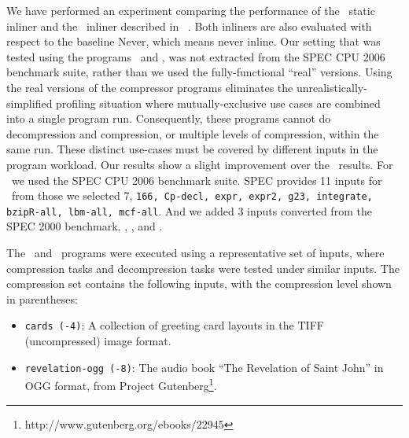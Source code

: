 
We have performed an experiment comparing the performance of the \llvm\ static inliner and the \FDI\ inliner described in ~\cite{BerubePhD}. Both inliners are also evaluated with respect to the baseline Never, which means never inline. Our setting that was tested using the programs \bzip\ and \gzip, was not extracted from the SPEC CPU 2006 benchmark suite, rather than we used the fully-functional ``real'' versions. Using the real versions of the compressor programs eliminates the unrealistically-simplified profiling situation where mutually-exclusive use cases are combined into a single program run. Consequently, these programs cannot do decompression and compression, or multiple levels of compression, within the same run.  These distinct use-cases must be covered by different inputs in the program workload. Our results show a slight improvement over the \llvm\ results. For \gcc\ we used the SPEC CPU 2006 benchmark suite.  SPEC provides 11 inputs for \gcc\ from those we selected 7, {\tt 166, Cp-decl, expr, expr2, g23, integrate, bzipR-all, lbm-all, mcf-all}. And we added 3 inputs converted from the SPEC 2000 benchmark, \bzip, \lbm, and \mcf.

The \bzip\ and \gzip\ programs were executed using a representative set of inputs, where compression tasks and decompression tasks were tested under similar inputs.
The compression set contains the following inputs, with the compression level shown in parentheses:
\begin{itemize}


\item {\tt cards (-4)}: A collection of greeting card layouts in the TIFF (uncompressed) image format.




\item {\tt revelation-ogg (-8)}: The audio book ``The Revelation of Saint John'' in OGG format, from Project Gutenberg\footnote{http://www.gutenberg.org/ebooks/22945}.


\end{itemize}

